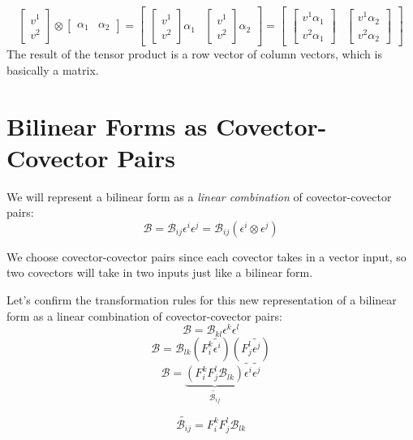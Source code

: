 \documentclass{report}
\begin{document}
$$ \begin{bmatrix} v^1 \\ v^2 \end{bmatrix} \otimes \begin{bmatrix} \alpha_1 & \alpha_2 \end{bmatrix} = \begin{bmatrix} \begin{bmatrix} v^1 \\ v^2 \end{bmatrix} \alpha_1 & \begin{bmatrix} v^1 \\ v^2 \end{bmatrix} \alpha_2 \end{bmatrix} = \begin{bmatrix} \begin{bmatrix} v^1 \alpha_1 \\ v^2 \alpha_1 \end{bmatrix} & \begin{bmatrix} v^1 \alpha_2 \\ v^2 \alpha_2  \end{bmatrix}   \end{bmatrix}   $$ 
The result of the tensor product is a row vector of column vectors, which is basically a matrix.

\section{Bilinear Forms as Covector-Covector Pairs}
We will represent a bilinear form as a \emph{linear combination} of covector-covector pairs:
$$ \mathcal{B} = \mathcal{B}_{ij} \epsilon^i \epsilon^j = \mathcal{B}_{ij} \left(\epsilon^i \otimes \epsilon^j\right) $$ 

We choose covector-covector pairs since each covector takes in a vector input, so two covectors will take in two inputs just like a bilinear form.

Let's confirm the transformation rules for this new representation of a bilinear form as a linear combination of covector-covector pairs:
$$ \mathcal{B} = \mathcal{B}_{kl} \epsilon^k \epsilon^l $$ 
$$ \mathcal{B} = \mathcal{B}_{lk} \left( F_i^k \widetilde{\epsilon^i} \right) \left( F_j^l \widetilde{\epsilon^j} \right) $$ 
$$ \mathcal{B} = \underbrace{\left(F_i^k F_j^l \mathcal{B}_{lk}  \right)}_{\widetilde{\mathcal{B}_{ij}}} \widetilde{\epsilon^i} \widetilde{\epsilon^j} $$ 

$$ \widetilde{\mathcal{B}_{ij}} = F_i^k F_j^l \mathcal{B}_{lk} $$ 
\end{document}
